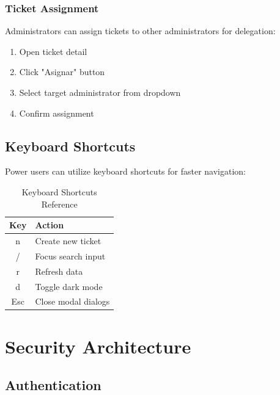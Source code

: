 \documentclass[12pt,a4paper]{report}
\begin{document}
\subsection{Ticket Assignment}
Administrators can assign tickets to other administrators for delegation:

\begin{enumerate}
    \item Open ticket detail
    \item Click "Asignar" button
    \item Select target administrator from dropdown
    \item Confirm assignment
\end{enumerate}

\section{Keyboard Shortcuts}
\label{sec:shortcuts}

Power users can utilize keyboard shortcuts for faster navigation:

\begin{table}[H]
    \centering
    \caption[Keyboard Shortcuts Reference]{Keyboard Shortcuts Reference}
    \begin{tabular}{|c|l|}
        \hline
        \textbf{Key} & \textbf{Action} \\
        \hline
        n & Create new ticket \\
        \hline
        / & Focus search input \\
        \hline
        r & Refresh data \\
        \hline
        d & Toggle dark mode \\
        \hline
        Esc & Close modal dialogs \\
        \hline
    \end{tabular}
    \label{tab:shortcuts}
\end{table}

\cleardoublepage

\chapter{Security Architecture}
\thispagestyle{fancy}
\label{chap:security}

\section{Authentication}
\label{sec:authentication}
\end{document}
